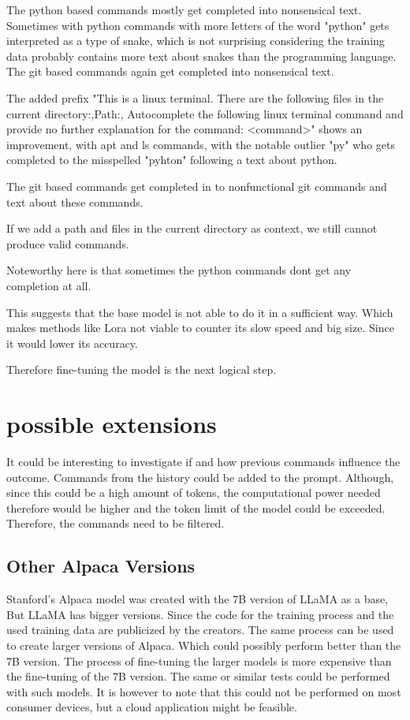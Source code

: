 The python based commands mostly get completed into nonsensical text. Sometimes with python commands with more letters of the word "python" gets interpreted as a type of snake, which is not surprising considering the training data probably contains more text about snakes than the programming language. The git based commands again get completed into nonsensical text.


The added prefix  "This is a linux terminal. There are the following files in the current  directory:,Path:, Autocomplete the following linux terminal command and provide no further explanation for the command: <command>" shows an improvement, with apt and ls commands, with the notable outlier "py" who gets completed to the misspelled "pyhton" following a text about python.

The git based commands get completed in to nonfunctional git commands and text about these commands.


If we add a path and files in the current directory as context, we still cannot produce valid commands.

Noteworthy here is that sometimes the python commands dont get any completion at all.


This suggests that the base model is not able to do it in a sufficient way. Which makes methods like Lora not viable 
 to counter its slow speed and big size. Since it would lower its accuracy. 

Therefore fine-tuning the model is the next logical step.

\section{possible extensions}



It could be interesting to investigate if and how previous commands influence the outcome. Commands from the history could be added to the prompt. Although, since this could be a high amount of tokens, the computational power needed therefore would be higher and the token limit of the model could be exceeded. Therefore, the commands need to be filtered. 



\subsection{Other Alpaca Versions}

Stanford's Alpaca model was created with the 7B version of LLaMA as a base, But LLaMA has bigger versions.  Since the code for the training process and the used training data are publicized by the creators. The same process can be used to create larger versions of Alpaca. Which could possibly perform better than the 7B version. The process of fine-tuning the larger models is more expensive than the fine-tuning of the 7B version. The same or similar tests could be performed with such models. It is however to note that this could not be performed on most consumer devices, but a cloud application might be feasible.


